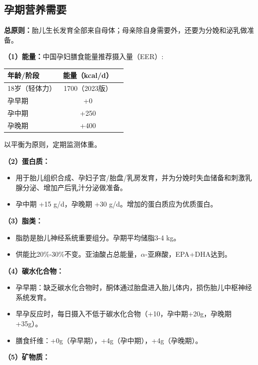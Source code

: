 \subsection{孕期营养需要}

\begin{keybox}
\textbf{总原则：}胎儿生长发育全部来自母体；母亲除自身需要外，还要为分娩和泌乳做准备。

\textbf{（1）能量：}中国孕妇膳食能量推荐摄入量（EER）:
\begin{center}
\begin{tabular}{lcc}
\hline
\textbf{年龄/阶段} & \textbf{能量（kcal/d）} \\
\hline
18岁（轻体力） & 1700（2023版） \\
孕早期 & +0 \\
孕中期 & +250 \\
孕晚期 & +400 \\
\hline
\end{tabular}
\end{center}
以平衡为原则，定期监测体重。

\textbf{（2）蛋白质：}
\begin{itemize}[leftmargin=*]
    \item 用于胎儿组织合成、孕妇子宫/胎盘/乳房发育，并为分娩时失血储备和刺激乳腺分泌、增加产后乳汁分泌做准备。
    \item 孕中期 +15 g/d，孕晚期 +30 g/d。增加的蛋白质应为优质蛋白。
\end{itemize}

\textbf{（3）脂类：}
\begin{itemize}[leftmargin=*]
    \item 脂肪是胎儿神经系统重要组分。孕期平均储脂3-4 kg。
    \item 供能比20\%-30\%不变。亚油酸占总能量，$\alpha$-亚麻酸，EPA+DHA达到。
\end{itemize}

\textbf{（4）碳水化合物：}
\begin{itemize}[leftmargin=*]
    \item 孕早期：缺乏碳水化合物时，酮体通过胎盘进入胎儿体内，损伤胎儿中枢神经系统发育。
    \item 早孕反应时，每日摄入不低于碳水化合物（+10，孕中期+20g，孕晚期+35g）。
    \item 膳食纤维：+0g（孕早期），+4g（孕中期），+4g（孕晚期）。
\end{itemize}

\textbf{（5）矿物质：}


\end{keybox}
